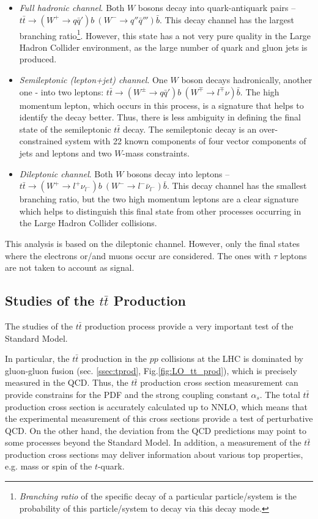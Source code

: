 \begin{itemize}
 \item \textit{Full hadronic channel}. Both $W$ bosons decay into quark-antiquark pairs -- $t\bar{t} \rightarrow (W^{+} \rightarrow q\bar{q}')b\:(W^{-} \rightarrow q''\bar{q}''')\bar{b}$.
 This decay channel has the largest branching ratio\footnote{\textit{Branching ratio} of the specific decay of a particular particle/system is the probability of this particle/system
 to decay via this decay mode.}. However, this state has a not very pure quality in the Large Hadron Collider environment, as the large number of quark and gluon jets is produced.
 
 \item \textit{Semileptonic (lepton+jet) channel}. One $W$ boson decays hadronically, another one - into two leptons:  $t\bar{t} \rightarrow (W^{\pm} \rightarrow q\bar{q}')b \: (W^{\mp} \rightarrow l^{\mp}\nu)\bar{b}$.
 The high momentum lepton, which occurs in this process, is a signature that helps to identify the decay better. Thus, there is less
 ambiguity in defining the final state of the semileptonic $t\bar{t}$ decay. The semileptonic decay is an over-constrained system with 22 known components of four vector components of
 jets and leptons and two $W$-mass constraints.
 
 \item \textit{Dileptonic channel}. Both $W$ bosons decay into leptons -- $t\bar{t} \rightarrow (W^{+} \rightarrow l^{+}\nu_{l^{-}})b \: (W^{-} \rightarrow l^{-}\bar{\nu}_{l^{-}})\bar{b}$.
 This decay channel has the smallest branching ratio, but the two high momentum leptons are a clear signature which helps to distinguish this final state from other processes
 occurring in the Large Hadron Collider collisions.
\end{itemize}

This analysis is based on the dileptonic channel. However, only the final states where the electrons or/and muons occur are considered. The ones with $\tau$ leptons are 
not taken to account as signal.

\subsection{Studies of the $t\bar{t}$ Production}

The studies of the $t\bar{t}$ production process provide a very important test of the Standard Model. 

In particular, the $t\bar{t}$ production in the $pp$ collisions at the LHC is dominated by gluon-gluon fusion (sec. \ref{ssec:tprod}, Fig.\ref{fig:LO_tt_prod}), which 
is precisely measured in the QCD. Thus, the $t\bar{t}$ production cross section measurement can provide constrains for the PDF and the strong coupling constant $\alpha_s$.
The total $t\bar{t}$ production cross section is accurately calculated up to NNLO, which means that the experimental measurement of this cross sections provide a 
test of perturbative QCD.
On the other hand, the deviation from the QCD predictions may point to some processes beyond the Standard Model. In addition, a measurement of the $t\bar{t}$ production 
cross sections may deliver information about various top properties, e.g. mass or spin of the $t$-quark.